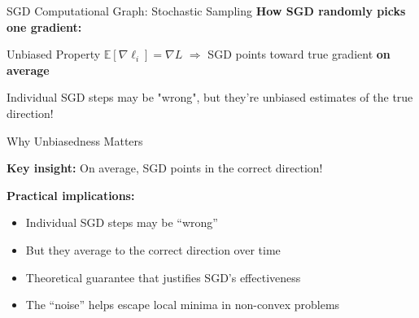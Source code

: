 \documentclass[usenames,dvipsnames]{beamer}
\newcommand{\E}{\mathbb{E}}
\begin{document}
  \begin{frame}{SGD Computational Graph: Stochastic Sampling}
    \textbf{How SGD randomly picks one gradient:}
    
    \begin{center}
    \end{center}

    \vspace{0.5cm}
    \begin{alertbox}{Unbiased Property}
    {\small $\E[\nabla\ell_i] = \nabla L$ $\Rightarrow$ SGD points toward true gradient \textbf{on average}}
    \end{alertbox}

    \begin{keypointsbox}{}
    {\small Individual SGD steps may be "wrong", but they're unbiased estimates of the true direction!}
    \end{keypointsbox}
  \end{frame}

  \begin{frame}{Why Unbiasedness Matters}
    \begin{keypointsbox}{}
    \textbf{Key insight:} On average, SGD points in the correct direction!
    \end{keypointsbox}
    
    \pause
    \textbf{Practical implications:}
    \begin{itemize}[<+->]
        \item Individual SGD steps may be ``wrong''
        \item But they average to the correct direction over time
        \item Theoretical guarantee that justifies SGD's effectiveness
        \item The ``noise'' helps escape local minima in non-convex problems
    \end{itemize}
  \end{frame}
\end{document}
